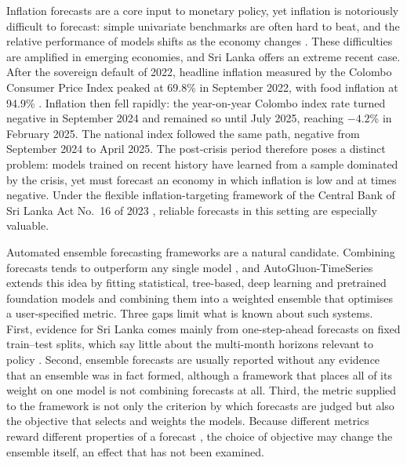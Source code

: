 \documentclass[12pt]{article}
\begin{document}
Inflation forecasts are a core input to monetary policy, yet inflation is
notoriously difficult to forecast: simple univariate benchmarks are often hard
to beat, and the relative performance of models shifts as the economy changes
\citep{atkeson2001, stock2007, faust2013, rossi2013}. These difficulties are
amplified in emerging economies, and Sri Lanka offers an extreme recent case.
After the sovereign default of 2022, headline inflation measured by the Colombo
Consumer Price Index peaked at 69.8\% in September 2022, with food inflation at
94.9\% \citep{cbsl2022sep}. Inflation then fell rapidly: the year-on-year
Colombo index rate turned negative in September 2024 and remained so until July
2025, reaching $-4.2$\% in February 2025. The national index followed the same
path, negative from September 2024 to April 2025. The post-crisis period therefore poses a distinct problem: models
trained on recent history have learned from a sample dominated by the crisis,
yet must forecast an economy in which inflation is low and at times negative.
Under the flexible inflation-targeting framework of the Central Bank of Sri
Lanka Act No.~16 of 2023 \citep{cbslact2023}, reliable forecasts in this
setting are especially valuable.

Automated ensemble forecasting frameworks are a natural candidate. Combining
forecasts tends to outperform any single model \citep{bates1969,
timmermann2006}, and AutoGluon-TimeSeries \citep{shchur2023autogluon} extends
this idea by fitting statistical, tree-based, deep learning and pretrained
foundation models and combining them into a weighted ensemble that optimises a
user-specified metric. Three gaps limit what is known about such systems.
First, evidence for Sri Lanka comes mainly from one-step-ahead forecasts on
fixed train--test splits, which say little about the multi-month horizons
relevant to policy \citep{slchapter2025, raj2024}. Second, ensemble forecasts
are usually reported without any evidence that an ensemble was in fact formed,
although a framework that places all of its weight on one model is not
combining forecasts at all. Third, the metric
supplied to the framework is not only the criterion by which forecasts are
judged but also the objective that selects and weights the models. Because
different metrics reward different properties of a forecast
\citep{gneiting2011}, the choice of objective may change the ensemble itself,
an effect that has not been examined.
\end{document}

